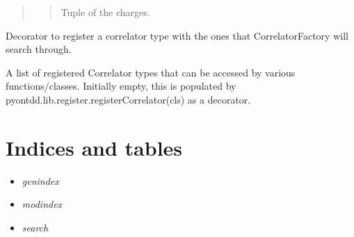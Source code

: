 \documentclass[letterpaper,10pt,english]{sphinxmanual}
\begin{document}
\begin{fulllineitems}
\begin{fulllineitems}
\begin{quote}
\begin{description}
\begin{quote}
Tuple of the charges.
\end{quote}

\end{description}\end{quote}

\end{fulllineitems}


\end{fulllineitems}

\label{index:module-pyontdd.lib.correlator}\label{index:module-pyontdd.lib.io}\label{index:module-pyontdd.lib.register}

\begin{fulllineitems}
\label{index:pyontdd.lib.register.registerCorrelator}
Decorator to register a correlator type with the ones that CorrelatorFactory will search through.

\end{fulllineitems}

\label{index:module-pyontdd.lib.registered_types}

\begin{fulllineitems}
\label{index:pyontdd.lib.registered_types.RegisteredCorrelatorTypes}
A list of registered Correlator types that can be accessed by various functions/classes.
Initially empty, this is populated by pyontdd.lib.register.registerCorrelator(cls) as a decorator.

\end{fulllineitems}



\chapter{Indices and tables}
\label{index:indices-and-tables}\label{index:welcome-to-pyontdd-s-documentation}\begin{itemize}
\item {} 
\emph{genindex}

\item {} 
\emph{modindex}

\item {} 
\emph{search}

\end{itemize}
\end{document}
